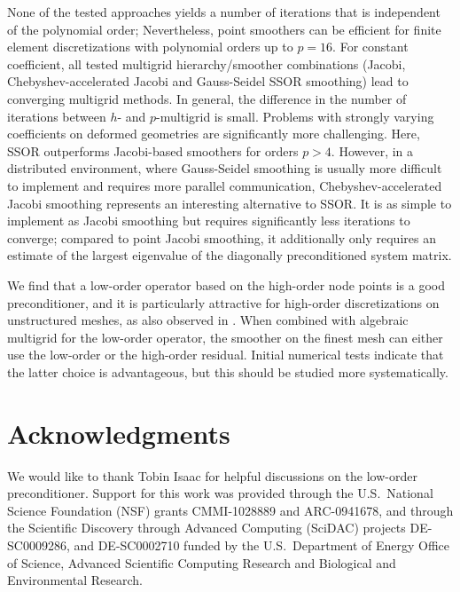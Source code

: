 \documentclass[times]{nlaauth}
\begin{document}
None of the tested approaches yields a number of iterations that is
independent of the polynomial order; Nevertheless, point smoothers can
be efficient for finite element discretizations with polynomial orders
up to $p=16$.  For constant coefficient, all tested multigrid
hierarchy/smoother combinations (Jacobi, Chebyshev-accelerated Jacobi
and Gauss-Seidel SSOR smoothing) lead to converging multigrid
methods. In general, the difference in the number of iterations
between $h$- and $p$-multigrid is small.
Problems with strongly varying coefficients on deformed
geometries are significantly more challenging. Here, SSOR outperforms
Jacobi-based smoothers for orders $p>4$. However, in a distributed
environment, where Gauss-Seidel smoothing is usually more difficult to
implement and requires more parallel communication,
Chebyshev-accelerated Jacobi smoothing represents an interesting
alternative to SSOR. It is as simple to implement as Jacobi smoothing
but requires significantly less iterations to converge; compared to
point Jacobi smoothing, it additionally only requires an estimate of
the largest eigenvalue of the diagonally preconditioned system matrix.


We find that a low-order operator based on the high-order node points
is a good preconditioner, and it is particularly attractive for
high-order discretizations on unstructured meshes, as also observed in
\cite{Brown10, DevilleMund90, HeysManteuffelMcCormickEtAl05}.  When
combined with algebraic multigrid for the low-order operator, the
smoother on the finest mesh can either use the low-order or the
high-order residual. Initial numerical tests indicate that the latter
choice is advantageous, but this should be studied more systematically.





\section*{Acknowledgments}
We would like to thank Tobin Isaac for helpful discussions on the
low-order preconditioner. Support for this work was
  provided through the U.S.~National Science Foundation (NSF) grants
  CMMI-1028889 and   %
  ARC-0941678,       %
 and through the Scientific Discovery through Advanced
  Computing (SciDAC) projects 
  DE-SC0009286,   %
  and DE-SC0002710 %
  funded by the U.S.~Department of Energy
  Office of Science, Advanced Scientific Computing Research and
  Biological and Environmental Research.




\end{document}

